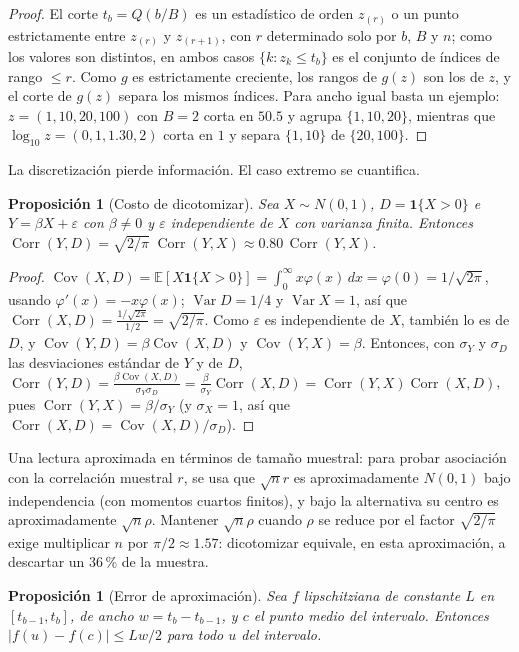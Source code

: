 \documentclass[11pt,a4paper]{article}
\theoremstyle{plain}
\newtheorem{proposicion}[teorema]{Proposición}
\theoremstyle{definition}
\theoremstyle{remark}
\newcommand{\E}{\mathbb{E}}
\newcommand{\Var}{\operatorname{Var}}
\newcommand{\Cov}{\operatorname{Cov}}
\newcommand{\Corr}{\operatorname{Corr}}
\newcommand{\1}{\mathbf{1}}
\newcommand{\ind}[1]{\mathbf{1}\{#1\}}
\begin{document}
\begin{proof}
El corte $t_b=Q(b/B)$ es un estadístico de orden $z_{(r)}$ o un punto
estrictamente entre $z_{(r)}$ y $z_{(r+1)}$, con $r$ determinado solo por
$b$, $B$ y $n$; como los valores son distintos, en ambos casos
$\{k:z_k\le t_b\}$ es el conjunto de índices de rango $\le r$. Como $g$ es
estrictamente creciente, los rangos de $g(z)$ son los de $z$, y el corte
de $g(z)$ separa los mismos índices. Para ancho igual basta un ejemplo:
$z=(1,10,20,100)$ con $B=2$ corta en $50.5$ y agrupa $\{1,10,20\}$,
mientras que $\log_{10}z=(0,1,1.30,2)$ corta en $1$ y separa $\{1,10\}$ de
$\{20,100\}$.
\end{proof}

La discretización pierde información. El caso extremo se cuantifica.

\begin{proposicion}[Costo de dicotomizar]\label{prop:dicot}
Sea $X\sim N(0,1)$, $D=\ind{X>0}$ e $Y=\beta X+\varepsilon$ con
$\beta\ne0$ y $\varepsilon$ independiente de $X$ con varianza finita.
Entonces $\Corr(Y,D)=\sqrt{2/\pi}\;\Corr(Y,X)\approx0.80\,\Corr(Y,X)$.
\end{proposicion}

\begin{proof}
$\Cov(X,D)=\E[X\ind{X>0}]=\int_0^\infty x\varphi(x)\,dx=\varphi(0)=1/\sqrt{2\pi}$,
usando $\varphi'(x)=-x\varphi(x)$; $\Var D=1/4$ y $\Var X=1$, así que
$\Corr(X,D)=\frac{1/\sqrt{2\pi}}{1/2}=\sqrt{2/\pi}$. Como $\varepsilon$ es
independiente de $X$, también lo es de $D$, y
$\Cov(Y,D)=\beta\Cov(X,D)$ y $\Cov(Y,X)=\beta$. Entonces, con $\sigma_Y$ y
$\sigma_D$ las desviaciones estándar de $Y$ y de $D$,
$\Corr(Y,D)=\frac{\beta\Cov(X,D)}{\sigma_Y\sigma_D}
=\frac{\beta}{\sigma_Y}\Corr(X,D)=\Corr(Y,X)\Corr(X,D)$, pues
$\Corr(Y,X)=\beta/\sigma_Y$ (y $\sigma_X=1$, así que $\Corr(X,D)=\Cov(X,D)/\sigma_D$).
\end{proof}

Una lectura aproximada en términos de tamaño muestral: para probar
asociación con la correlación muestral $r$, se usa que $\sqrt nr$ es
aproximadamente $N(0,1)$ bajo independencia (con momentos cuartos
finitos), y bajo la alternativa su centro es aproximadamente $\sqrt
n\rho$. Mantener $\sqrt n\rho$ cuando $\rho$ se reduce por el factor
$\sqrt{2/\pi}$ exige multiplicar $n$ por $\pi/2\approx1.57$: dicotomizar
equivale, en esta aproximación, a descartar un 36\,\% de la muestra.

\begin{proposicion}[Error de aproximación]\label{prop:lipschitz}
Sea $f$ lipschitziana de constante $L$ en $[t_{b-1},t_b]$, de ancho
$w=t_b-t_{b-1}$, y $c$ el punto medio del intervalo. Entonces
$|f(u)-f(c)|\le Lw/2$ para todo $u$ del intervalo.
\end{proposicion}
\end{document}
